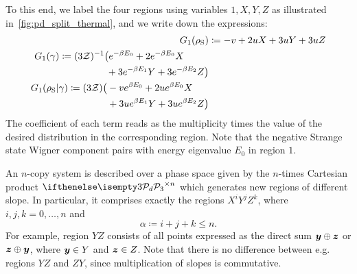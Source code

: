 \documentclass[pra,
aps,
twocolumn,
superscriptaddress,
groupedaddress,
nofootinbib,
reprint
]{revtex4-1}
\begin{document}
To this end, we label the four regions using variables $1,X,Y,Z$ as illustrated in~\cref{fig:pd_split_thermal}, and we write down the expressions:
\begin{align}\label{eq:g1}
	G_1(\rho_{\rm{S}}) &\coloneqq -v + 2u X + 3u Y + 3u Z \\
	\begin{split}
	G_1(\gamma) &\coloneqq (3\mathcal{Z})^{-1} \big( e^{-\beta E_0} + 2e^{-\beta E_0} X \\
	&\hspace{49pt} + 3e^{-\beta E_1} Y + 3e^{-\beta E_2} Z \big) 
	\end{split}
	\\
	\begin{split}
	G_1(\rho_{\rm{S}}|\gamma) &\coloneqq (3\mathcal{Z}) \big( -v e^{\beta E_0} + 2u e^{\beta E_0} X \\
	&\hspace{41pt} + 3u e^{\beta E_1} Y + 3u e^{\beta E_2} Z \big)
	\end{split}
\end{align}
The coefficient of each term reads as the multiplicity times the value of the desired distribution in the corresponding region.
Note that the negative Strange state Wigner component pairs with energy eigenvalue $E_0$ in region $1$.

An $n$-copy system is described over a phase space given by the $n$-times Cartesian product $\pd[3]^{\times n}$ which generates new regions of different slope.
In particular, it comprises exactly the regions $X^i Y^j Z^k$, where $i,j,k = 0,\dots,n$ and 
\begin{equation}
	\alpha \coloneqq i+j+k \leq n.
\end{equation}
For example, region $YZ$ consists of all points expressed as the direct sum $\bm{y} \oplus \bm{z}$ or $\bm{z} \oplus \bm{y}$, where $\bm{y} \in Y$ and $\bm{z} \in Z$.
Note that there is no difference between e.g. regions $YZ$ and $ZY$, since multiplication of slopes is commutative. 
\end{document}
